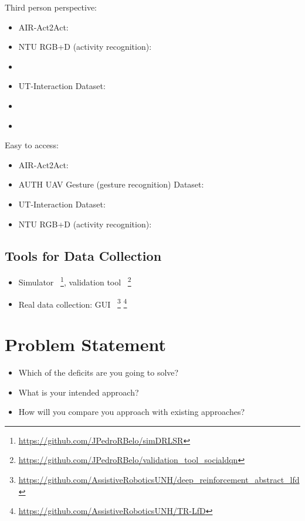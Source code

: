 \documentclass[thesis]{mas_proposal}
\begin{document}
Third person perspective:
\begin{itemize}
	\item AIR-Act2Act: \cite{Ko2021}
	\item NTU RGB+D (activity recognition): \cite{Liu2020}
	\item \cite{Hu2013}
	\item UT-Interaction Dataset: \cite{UT-Interaction-Data}
	\item \cite{Gemeren2016}
	\item \cite{Yun2012}
\end{itemize}

Easy to access:
\begin{itemize}
	\item AIR-Act2Act: \cite{Ko2021}
	\item AUTH UAV Gesture (gesture recognition) Dataset:~\cite{patrona2021overview,Liu2020,Perera_2018_ECCV_Workshops}
	\item UT-Interaction Dataset: \cite{UT-Interaction-Data}
	\item NTU RGB+D (activity recognition): \cite{Liu2020,Shahroudy_2016_CVPR}
\end{itemize}

\subsection{Tools for Data Collection}
\begin{itemize}
\item Simulator~\cite{Belo2021} \footnote{\url{https://github.com/JPedroRBelo/simDRLSR}}, validation tool~\cite{Belo2022} \footnote{\url{https://github.com/JPedroRBelo/validation_tool_socialdqn}}

\item Real data collection:  GUI~\cite{Turner2018} \footnote{\url{https://github.com/AssistiveRoboticsUNH/deep_reinforcement_abstract_lfd}} \cite{carpio2018learning,carpio2019learning} \footnote{\url{https://github.com/AssistiveRoboticsUNH/TR-LfD}}
\end{itemize}

\section{Problem Statement}
\begin{itemize}
    \item Which of the deficits are you going to solve?
    \item What is your intended approach?
    \item How will you compare you approach with existing approaches?
\end{itemize}
\end{document}
